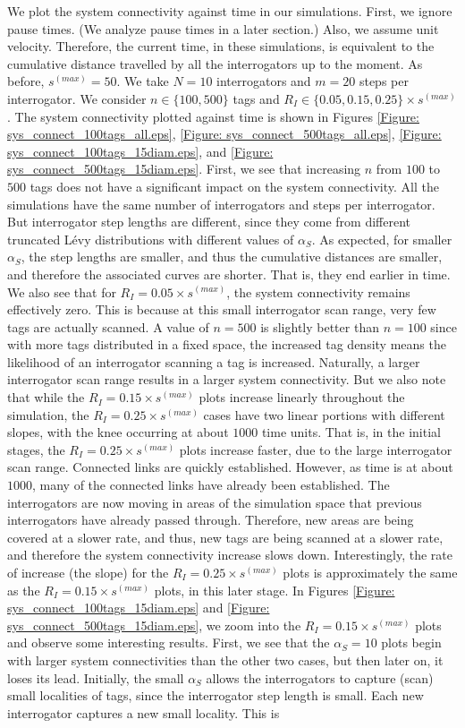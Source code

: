 We plot the system connectivity against time in our simulations. First, we ignore pause times. (We analyze pause times in a later section.) Also, we assume unit velocity. Therefore, the current time, in these simulations, is equivalent to the cumulative distance travelled by all the interrogators up to the moment. As before, $s^{(max)} = 50$. We take $N = 10$ interrogators and $m = 20$ steps per interrogator. We consider $n \in \{100, 500\}$ tags and $R_I \in \{0.05, 0.15, 0.25\} \times s^{(max)}$. The system connectivity plotted against time is shown in Figures \ref{Figure: sys_connect_100tags_all.eps}, \ref{Figure: sys_connect_500tags_all.eps}, \ref{Figure: sys_connect_100tags_15diam.eps}, and \ref{Figure: sys_connect_500tags_15diam.eps}. First, we see that increasing $n$ from $100$ to $500$ tags does not have a significant impact on the system connectivity. All the simulations have the same number of interrogators and steps per interrogator. But interrogator step lengths are different, since they come from different truncated L\'{e}vy distributions with different values of $\alpha_S$. As expected, for smaller $\alpha_S$, the step lengths are smaller, and thus the cumulative distances are smaller, and therefore the associated curves are shorter. That is, they end earlier in time. We also see that for $R_I = 0.05 \times s^{(max)}$, the system connectivity remains effectively zero. This is because at this small interrogator scan range, very few tags are actually scanned. A value of $n = 500$ is slightly better than $n = 100$ since with more tags distributed in a fixed space, the increased tag density means the likelihood of an interrogator scanning a tag is increased. Naturally, a larger interrogator scan range results in a larger system connectivity. But we also note that while the $R_I = 0.15 \times s^{(max)}$ plots increase linearly throughout the simulation, the $R_I = 0.25 \times s^{(max)}$ cases have two linear portions with different slopes, with the knee occurring at about $1000$ time units. That is, in the initial stages, the $R_I = 0.25 \times s^{(max)}$ plots increase faster, due to the large interrogator scan range. Connected links are quickly established. However, as time is at about $1000$, many of the connected links have already been established. The interrogators are now moving in areas of the simulation space that previous interrogators have already passed through. Therefore, new areas are being covered at a slower rate, and thus, new tags are being scanned at a slower rate, and therefore the system connectivity increase slows down. Interestingly, the rate of increase (the slope) for the $R_I = 0.25 \times s^{(max)}$ plots is approximately the same as the $R_I = 0.15 \times s^{(max)}$ plots, in this later stage. In Figures \ref{Figure: sys_connect_100tags_15diam.eps} and \ref{Figure: sys_connect_500tags_15diam.eps}, we zoom into the $R_I = 0.15 \times s^{(max)}$ plots and observe some interesting results. First, we see that the $\alpha_S = 10$ plots begin with larger system connectivities than the other two cases, but then later on, it loses its lead. Initially, the small $\alpha_S$ allows the interrogators to capture (scan) small localities of tags, since the interrogator step length is small. Each new interrogator captures a new small locality. This is 